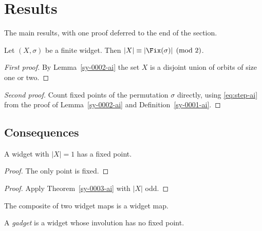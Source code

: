 \section{Results}\label{sy-0200-ai}

The main results, with one proof deferred to the end of the section.


\begin{theorem}[Parity]\label{sy-0003-ai}
Let $(X,\sigma)$ be a finite widget. Then $|X| \equiv |\Fix(\sigma)| \pmod 2$.
\end{theorem}
\begin{proof}[First proof]\label{sy-0004-ai}
By Lemma~\ref{sy-0002-ai} the set $X$ is a disjoint union of orbits of size one or two.
\end{proof}
\begin{proof}[Second proof]\label{sy-0005-ai}
Count fixed points of the permutation $\sigma$ directly, using \eqref{eq:step-ai} from the proof of Lemma~\ref{sy-0002-ai} and Definition~\ref{sy-0001-ai}.
\end{proof}


\subsection{Consequences}\label{sy-0201-ai}

\begin{proposition}\label{sy-0006-ai}
A widget with $|X| = 1$ has a fixed point.
\end{proposition}
\begin{proof}
The only point is fixed.
\end{proof}
\begin{proof}
Apply Theorem~\ref{sy-0003-ai} with $|X|$ odd.
\end{proof}



\begin{lemma}[Deferred]\label{sy-0007-ai}
The composite of two widget maps is a widget map.
\end{lemma}


\begin{definition}[Gadget]\label{sy-0008-ai}\label{def:gadget-ai}\label{defn:gadget-old-ai}
A \emph{gadget} is a widget whose involution has no fixed point.
\end{definition}


